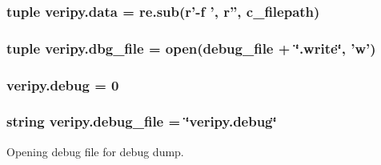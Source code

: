 \hypertarget{namespaceveripy_a608d33395d3b79244c5869f6a0f081c6}{
\subsubsection[{data}]{\setlength{\rightskip}{0pt plus 5cm}tuple veripy.\-data = re.\-sub(r'-\/{\bf f} ', r'', {\bf c\-\_\-filepath})}}\label{namespaceveripy_a608d33395d3b79244c5869f6a0f081c6}
\hypertarget{namespaceveripy_aa41cbf123e5f09c0db694b12b8babbad}{
\subsubsection[{dbg\-\_\-file}]{\setlength{\rightskip}{0pt plus 5cm}tuple veripy.\-dbg\-\_\-file = open({\bf debug\-\_\-file} + \char`\"{}.write\char`\"{}, 'w')}}\label{namespaceveripy_aa41cbf123e5f09c0db694b12b8babbad}
\hypertarget{namespaceveripy_aa31f673a176e6344d30ade070309153d}{
\subsubsection[{debug}]{\setlength{\rightskip}{0pt plus 5cm}veripy.\-debug = 0}}\label{namespaceveripy_aa31f673a176e6344d30ade070309153d}
\hypertarget{namespaceveripy_a0d00d319a78d1019f3fe9eecfe1add32}{
\subsubsection[{debug\-\_\-file}]{\setlength{\rightskip}{0pt plus 5cm}string veripy.\-debug\-\_\-file = \char`\"{}veripy.\-debug\char`\"{}}}\label{namespaceveripy_a0d00d319a78d1019f3fe9eecfe1add32}


Opening debug file for debug dump. 

